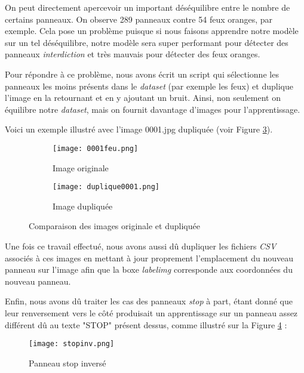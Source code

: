 \documentclass[twocolumn,10pt]{article}
\begin{document}
    On peut directement apercevoir un important déséquilibre entre le nombre de certains panneaux. On observe 289 panneaux contre 54 feux oranges, par exemple. Cela pose un problème puisque si nous faisons apprendre notre modèle sur un tel déséquilibre, notre modèle sera super performant pour détecter des panneaux \textit{interdiction} et très mauvais pour détecter des feux oranges.

    Pour répondre à ce problème, nous avons écrit un script qui sélectionne les panneaux les moins présents dans le \textit{dataset} (par exemple les feux) et duplique l’image en la retournant et en y ajoutant un bruit. Ainsi, non seulement on équilibre notre \textit{dataset}, mais on fournit davantage d’images pour l’apprentissage.

    Voici un exemple illustré avec l’image 0001.jpg dupliquée (voir Figure \ref{fig:comparaison-images}).

    \begin{figure}[H]
        \centering
        \begin{subfigure}[t]{0.45\linewidth}
            \centering
            \texttt{[image: 0001feu.png]}
            \caption{Image originale}
            \label{fig:image-originale}
        \end{subfigure}
        \hfill
        \begin{subfigure}[t]{0.45\linewidth}
            \centering
            \texttt{[image: duplique0001.png]}
            \caption{Image dupliquée}
            \label{fig:image-dupliquee}
        \end{subfigure}
        \caption{Comparaison des images originale et dupliquée}
        \label{fig:comparaison-images}
    \end{figure}
    Une fois ce travail effectué, nous avons aussi dû dupliquer les fichiers \textit{CSV} associés à ces images en mettant à jour proprement l’emplacement du nouveau panneau sur l’image afin que la boxe \textit{labelimg} corresponde aux coordonnées du nouveau panneau.

    Enfin, nous avons dû traiter les cas des panneaux \textit{stop} à part, étant donné que leur renversement vers le côté produisait un apprentissage sur un panneau assez différent dû au texte "STOP" présent dessus, comme illustré sur la Figure \ref{fig:stop-inverse} :
    \begin{figure}[H]
        \centering
        \texttt{[image: stopinv.png]}
        \caption{Panneau stop inversé}
        \label{fig:stop-inverse}
    \end{figure}
\end{document}
